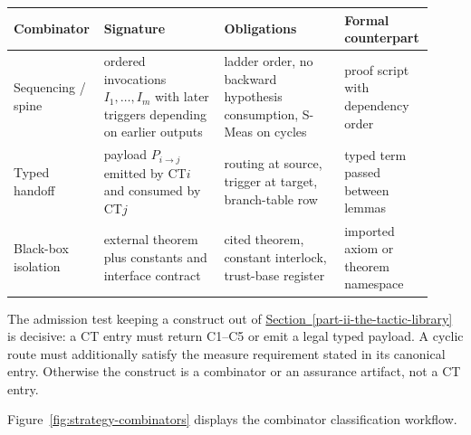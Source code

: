 \documentclass[
  11pt,
]{article}
\theoremstyle{definition}
\newcommand{\secref}[1]{\hyperref[#1]{Section~\ref*{#1}}}
\begin{document}
\begingroup
\small
\setlength{\tabcolsep}{2pt}
\begin{longtable}[]{@{}
  >{\raggedright\arraybackslash}p{0.18\linewidth}
  >{\raggedright\arraybackslash}p{0.28\linewidth}
  >{\raggedright\arraybackslash}p{0.28\linewidth}
  >{\raggedright\arraybackslash}p{0.18\linewidth}@{}}
\toprule\noalign{}
Combinator & Signature & Obligations & Formal counterpart \\
\midrule\noalign{}
\endhead
\bottomrule\noalign{}
\endlastfoot
Sequencing / spine & ordered invocations \(I_1,\ldots,I_m\) with later triggers depending on earlier outputs & ladder order, no backward hypothesis consumption, S-Meas on cycles & proof script with dependency order \\
Typed handoff & payload \(P_{i\to j}\) emitted by CT\(i\) and consumed by CT\(j\) & routing at source, trigger at target, branch-table row & typed term passed between lemmas \\
Black-box isolation & external theorem plus constants and interface contract & cited theorem, constant interlock, trust-base register & imported axiom or theorem namespace \\
\end{longtable}
\endgroup

The admission test keeping a construct out of \secref{part-ii-the-tactic-library} is decisive: a
CT entry must return C1--C5 or emit a legal typed payload. A cyclic route
must additionally satisfy the measure requirement stated in its
canonical entry. Otherwise the construct is a combinator or an
assurance artifact, not a CT entry.

Figure~\ref{fig:strategy-combinators} displays the combinator
classification workflow.
\end{document}
